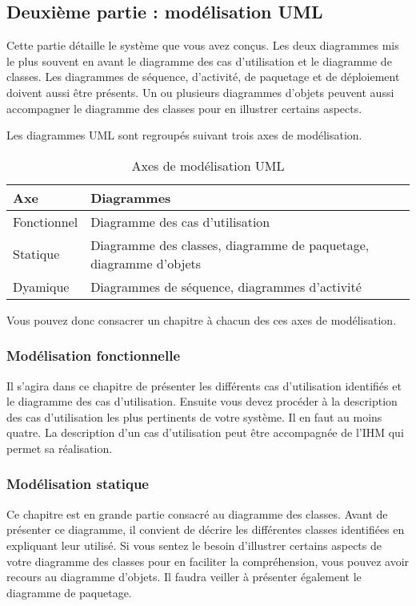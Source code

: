 \documentclass[12pt]{article}
\begin{document}
\subsection{Deuxième partie : modélisation UML}
Cette partie détaille le système que vous avez conçus. Les deux diagrammes mis le plus souvent en avant le diagramme des cas d'utilisation et le diagramme de classes. Les diagrammes de séquence, d'activité, de paquetage et de déploiement doivent aussi être présents. Un ou plusieurs diagrammes d'objets peuvent aussi accompagner le diagramme des classes pour en illustrer certains aspects.

Les diagrammes UML sont regroupés suivant trois axes de modélisation.

\begin{table}[!h]
  \begin{tabular}{|l|l|}
    \hline
    Axe & Diagrammes \\
    \hline
    Fonctionnel & Diagramme des cas d'utilisation \\
    \hline
    Statique & Diagramme des classes, diagramme de paquetage, diagramme d'objets \\
    \hline
    Dyamique & Diagrammes de séquence, diagrammes d'activité \\
    \hline
  \end{tabular}
  \caption{Axes de modélisation UML}
\end{table}

Vous pouvez donc consacrer un chapitre à chacun des ces axes de modélisation.

\subsubsection{Modélisation fonctionnelle}
Il s'agira dans ce chapitre de présenter les différents cas d'utilisation identifiés et le diagramme des cas d'utilisation. Ensuite vous devez procéder à la description des cas d'utilisation les plus pertinents de votre système. Il en faut au moins quatre. La description d'un cas d'utilisation peut être accompagnée de l'IHM qui permet sa réalisation.

\subsubsection{Modélisation statique}
Ce chapitre est en grande partie consacré au diagramme des classes. Avant de présenter ce diagramme, il convient de décrire les différentes classes identifiées en expliquant leur utilisé. Si vous sentez le besoin d'illustrer certains aspects de votre diagramme des classes pour en faciliter la compréhension, vous pouvez avoir recours au diagramme d'objets. Il faudra veiller à présenter également le diagramme de paquetage.
\end{document}
